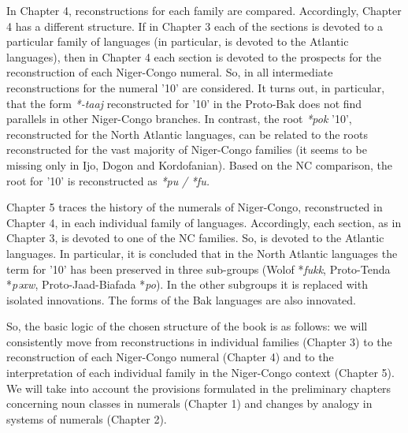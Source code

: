 In Chapter 4, reconstructions for each family are compared. Accordingly, Chapter 4 has a different structure. If in Chapter 3 each of the sections is devoted to a particular family of languages (in particular,  is devoted to the Atlantic languages), then in Chapter 4 each section is devoted to the prospects for the reconstruction of each Niger-Congo numeral. So, in  all intermediate reconstructions for the numeral '10' are considered. It turns out, in particular, that the form \textit{*-taaj} reconstructed for '10' in the Proto-Bak does not find parallels in other Niger-Congo branches. In contrast, the root \textit{*pok} '10', reconstructed for the North Atlantic languages, can be related to the roots reconstructed for the vast majority of Niger-Congo families (it seems to be missing only in Ijo, Dogon and Kordofanian). Based on the NC comparison, the root for '10' is reconstructed as \textit{*pu} \textit{/} \textit{*fu.}

Chapter 5 traces the history of the numerals of Niger-Congo, reconstructed in Chapter 4, in each individual family of languages. Accordingly, each section, as in Chapter 3, is devoted to one of the NC families. So,  is devoted to the Atlantic languages. In particular, it is concluded that in the North Atlantic languages the term for '10' has been preserved in three sub-groups (Wolof *\textit{fukk}, Proto-Tenda *\textit{pəxw}, Proto-Jaad-Biafada *\textit{po}). In the other subgroups it is replaced with isolated innovations. The forms of the Bak languages are also innovated.

So, the basic logic of the chosen structure of the book is as follows: we will consistently move from reconstructions in individual families (Chapter 3) to the reconstruction of each Niger-Congo numeral (Chapter 4) and to the interpretation of each individual family in the Niger-Congo context (Chapter 5). We will take into account the provisions formulated in the preliminary chapters concerning noun classes in numerals (Chapter 1) and changes by analogy in systems of numerals (Chapter 2).

